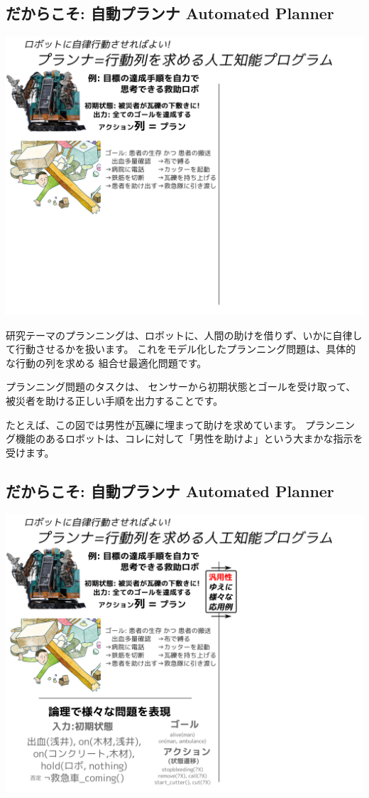 \subsection{だからこそ: 自動プランナ Automated Planner}
\label{sec-4-3}

\includegraphics{img/planning/1.png}

\begin{resume}
研究テーマのプランニングは、ロボットに、人間の助けを借りず、いかに自律して行動させるかを扱います。
これをモデル化したプランニング問題は、具体的な行動の列を求める 組合せ最適化問題です。

プランニング問題のタスクは、
センサーから初期状態とゴールを受け取って、被災者を助ける正しい手順を出力することです。

たとえば、この図では男性が瓦礫に埋まって助けを求めています。
プランニング機能のあるロボットは、コレに対して「男性を助けよ」という大まかな指示を受けます。
\end{resume}

\subsection{だからこそ: 自動プランナ Automated Planner}
\label{sec-4-4}

\includegraphics{img/planning/2.png}

